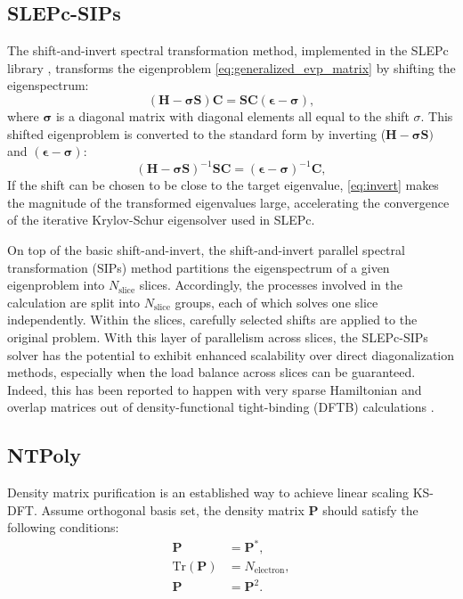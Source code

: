 \documentclass{report}
\begin{document}
\subsection{SLEPc-SIPs}
\label{subsec:solvers_sips}
The shift-and-invert spectral transformation method, implemented in the SLEPc library \cite{slepc_hernandez_2005}, transforms the eigenproblem \ref{eq:generalized_evp_matrix} by shifting the eigenspectrum:
\begin{equation}
\label{eq:shift}
(\boldsymbol{H} - \boldsymbol{\sigma} \boldsymbol{S}) \boldsymbol{C} = \boldsymbol{S} \boldsymbol{C} (\boldsymbol{\epsilon} - \boldsymbol{\sigma}) ,
\end{equation}
where $\boldsymbol{\sigma}$ is a diagonal matrix with diagonal elements all equal to the shift $\sigma$.  This shifted eigenproblem is converted to the standard form by inverting ($\boldsymbol{H} - \boldsymbol{\sigma S})$ and $(\boldsymbol{\epsilon - \sigma})$:
\begin{equation}
\label{eq:invert}
(\boldsymbol{H} - \boldsymbol{\sigma S})^{-1} \boldsymbol{S} \boldsymbol{C} = (\boldsymbol{\epsilon - \sigma})^{-1} \boldsymbol{C} ,
\end{equation}
If the shift can be chosen to be close to the target eigenvalue, \ref{eq:invert} makes the magnitude of the transformed eigenvalues large, accelerating the convergence of the iterative Krylov-Schur eigensolver used in SLEPc.

On top of the basic shift-and-invert, the shift-and-invert parallel spectral transformation (SIPs) method \cite{sips_keceli_2016} partitions the eigenspectrum of a given eigenproblem into $N_\text{slice}$ slices.  Accordingly, the processes involved in the calculation are split into $N_\text{slice}$ groups, each of which solves one slice independently.  Within the slices, carefully selected shifts are applied to the original problem.  With this layer of parallelism across slices, the SLEPc-SIPs solver has the potential to exhibit enhanced scalability over direct diagonalization methods, especially when the load balance across slices can be guaranteed.  Indeed, this has been reported to happen with very sparse Hamiltonian and overlap matrices out of density-functional tight-binding (DFTB) calculations \cite{sips_keceli_2016}.

\subsection{NTPoly}
\label{subsec:solvers_ntpoly}
Density matrix purification is an established way to achieve linear scaling KS-DFT.  Assume orthogonal basis set, the density matrix $\boldsymbol{P}$ should satisfy the following conditions:
\begin{equation}
\label{eq:density_matrix_conditions}
\begin{split}
\boldsymbol{P} & = \boldsymbol{P}^* ,\\
\text{Tr}(\boldsymbol{P}) & = N_\text{electron} ,\\
\boldsymbol{P} & = \boldsymbol{P}^2 .
\end{split}
\end{equation}
\end{document}
